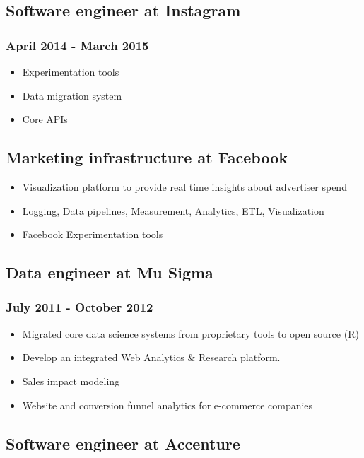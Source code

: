 \documentclass[letterpaper]{article}
\begin{document}
\subsection{Software engineer at Instagram}
\label{sec:Software-engineer-at-Instagram}
\subsubsection{April 2014 - March 2015}
\label{sec:April-2014-March-2015}
\begin{itemize}
\item Experimentation tools
\item Data migration system
\item Core APIs
\end{itemize}
\subsection{Marketing infrastructure at Facebook}
\label{sec:Marketing-infrastructure-at-Facebook}
\begin{itemize}
\item Visualization platform to provide real time insights about advertiser spend
\item Logging, Data pipelines, Measurement, Analytics, ETL, Visualization
\item Facebook Experimentation tools
\end{itemize}
\subsection{Data engineer at Mu Sigma}
\label{sec:Data-engineer-at-Mu-Sigma}
\subsubsection{July 2011 - October 2012}
\label{sec:July-2011-October-2012}
\begin{itemize}
\item Migrated core data science systems from proprietary tools to open source (R)
\item Develop an integrated Web Analytics \& Research platform.
\item Sales impact modeling
\item Website and conversion funnel analytics for e-commerce companies
\end{itemize}
\subsection{Software engineer at Accenture}
\label{sec:Software-engineer-at-Accenture}
\end{document}
